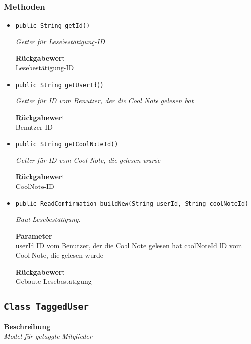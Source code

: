     \subsubsection{Methoden}
    \begin{itemize}
    	\item{\texttt{public String getId()}}
    	
    	\textit{Getter für Lesebestätigung-ID}
    	
    	
    	
    	\textbf{Rückgabewert} \\
    	Lesebestätigung-ID        \item{\texttt{public String getUserId()}}
    	
    	\textit{Getter für ID vom Benutzer, der die Cool Note gelesen hat}
    	
    	
    	
    	\textbf{Rückgabewert} \\
    	Benutzer-ID        \item{\texttt{public String getCoolNoteId()}}
    	
    	\textit{Getter für ID vom Cool Note, die gelesen wurde}
    	
    	
    	
    	\textbf{Rückgabewert} \\
    	CoolNote-ID        \item{\texttt{public ReadConfirmation buildNew(String userId, String coolNoteId)}}
    	
    	\textit{Baut Lesebestätigung.}
    	
    	\textbf{Parameter} \\
    	userId ID vom Benutzer, der die Cool Note gelesen hat
    	coolNoteId ID vom Cool Note, die gelesen wurde
    	
    	\textbf{Rückgabewert} \\
    	Gebaute Lesebestätigung
    \end{itemize}
    \subsection{\texttt{Class TaggedUser}}
    \textbf{Beschreibung} \\
    \textit{Model für getaggte Mitglieder}
